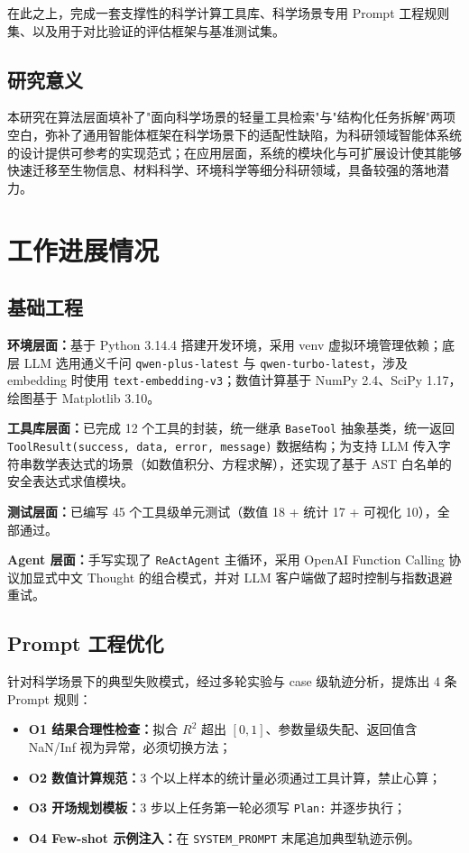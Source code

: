在此之上，完成一套支撑性的科学计算工具库、科学场景专用 Prompt 工程规则集、以及用于对比验证的评估框架与基准测试集。

\subsection{研究意义}

本研究在算法层面填补了"面向科学场景的轻量工具检索"与"结构化任务拆解"两项空白，弥补了通用智能体框架在科学场景下的适配性缺陷，为科研领域智能体系统的设计提供可参考的实现范式；在应用层面，系统的模块化与可扩展设计使其能够快速迁移至生物信息、材料科学、环境科学等细分科研领域，具备较强的落地潜力。

\section{工作进展情况}

\subsection{基础工程}

\textbf{环境层面：}基于 Python 3.14.4 搭建开发环境，采用 venv 虚拟环境管理依赖；底层 LLM 选用通义千问 \texttt{qwen-plus-latest} 与 \texttt{qwen-turbo-latest}，涉及 embedding 时使用 \texttt{text-embedding-v3}；数值计算基于 NumPy 2.4、SciPy 1.17，绘图基于 Matplotlib 3.10。

\textbf{工具库层面：}已完成 12 个工具的封装，统一继承 \texttt{BaseTool} 抽象基类，统一返回 \texttt{ToolResult(success, data, error, message)} 数据结构；为支持 LLM 传入字符串数学表达式的场景（如数值积分、方程求解），还实现了基于 AST 白名单的安全表达式求值模块。

\textbf{测试层面：}已编写 45 个工具级单元测试（数值 18 + 统计 17 + 可视化 10），全部通过。

\textbf{Agent 层面：}手写实现了 \texttt{ReActAgent} 主循环，采用 OpenAI Function Calling 协议加显式中文 Thought 的组合模式，并对 LLM 客户端做了超时控制与指数退避重试。

\subsection{Prompt 工程优化}

针对科学场景下的典型失败模式，经过多轮实验与 case 级轨迹分析，提炼出 4 条 Prompt 规则：

\begin{itemize}
    \item \textbf{O1 结果合理性检查：}拟合 $R^2$ 超出 $[0,1]$、参数量级失配、返回值含 NaN/Inf 视为异常，必须切换方法；
    \item \textbf{O2 数值计算规范：}3 个以上样本的统计量必须通过工具计算，禁止心算；
    \item \textbf{O3 开场规划模板：}3 步以上任务第一轮必须写 \texttt{Plan:} 并逐步执行；
    \item \textbf{O4 Few-shot 示例注入：}在 \texttt{SYSTEM\_PROMPT} 末尾追加典型轨迹示例。
\end{itemize}

